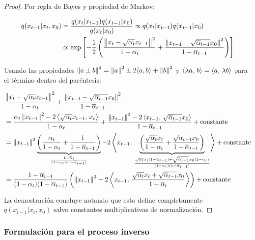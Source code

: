 \begin{proof}
    Por regla de Bayes y propiedad de Markov:

    \begin{align}
        q(x_{t-1}|x_t,x_0) & = \frac{q(x_t|x_{t-1})q(x_{t-1}|x_0)}{q(x_t|x_0)}\propto q(x_t|x_{t-1})q(x_{t-1}|x_0)\\
                           & \propto \exp\left[-\frac{1}{2}\left(\frac{\left\lVert x_t-\sqrt{\alpha_t}x_{t-1} \right\rVert^2}{1-\alpha_t} + \frac{\left\lVert x_{t-1}-\sqrt{\overline{\alpha}_{t-1}}x_0 \right\rVert^2}{1-\overline{\alpha}_{t-1}}\right)\right]
    \end{align}

    Usando las propiedades $\left\lVert a\pm b \right\rVert^2=\left\lVert a \right\rVert^2\pm 2\langle a,b\rangle + \left\lVert b \right\rVert^2$ y $\left\langle \lambda a,\,b\right\rangle = \left\langle a,\,\lambda b\right\rangle$ para el término dentro del paréntesis:

    \begin{align}
         & \frac{\left\lVert x_t-\sqrt{\alpha_t}x_{t-1} \right\rVert^2}{1-\alpha_t} + \frac{\left\lVert x_{t-1}-\sqrt{\overline{\alpha}_{t-1}}x_0 \right\rVert^2}{1-\overline{\alpha}_{t-1}}\\
         & = \frac{\alpha_t\left\lVert x_{t-1} \right\rVert^2-2\left\langle \sqrt{\alpha_t}x_{t-1},\,x_t\right\rangle}{1-\alpha_t} + \frac{\left\lVert x_{t-1} \right\rVert^2-2\left\langle x_{t-1},\,\sqrt{\overline{\alpha}_{t-1}} x_0\right\rangle}{1-\overline{\alpha}_{t-1}}+\operatorname{constante}\\
         & =\left\lVert x_{t-1} \right\rVert^2\underbrace{\left(\frac{\alpha_t}{1-\alpha_t}+\frac{1}{1-\overline{\alpha}_{t-1}}\right)}_{\frac{1-\overline{\alpha}_t}{(1-\alpha_t)(1-\overline{\alpha}_{t-1})}}-2\left\langle x_{t-1},\,\underbrace{\left(\frac{\sqrt{\alpha_t}x_t}{1-\alpha_t} + \frac{\sqrt{\overline{\alpha}_{t-1}}x_0}{1-\overline{\alpha}_{t-1}}\right)}_{\frac{\sqrt{\alpha_t}x_t(1-\overline{\alpha}_{t-1})+\sqrt{\overline{\alpha}_{t-1}}x_0(1-\alpha_t)}{(1-\alpha_t)(1-\overline{\alpha}_{t-1})}}\right\rangle + \operatorname{constante} \\
         & =\frac{1-\overline{\alpha}_{t-1}}{(1-\alpha_t)(1-\overline{\alpha}_{t-1})}\left(\left\lVert x_{t-1} \right\rVert^2-2\left\langle x_{t-1},\,\frac{\sqrt{\alpha_t}x_t + \sqrt{\overline{\alpha}_{t-1}}x_0}{1-\overline{\alpha}_t}\right\rangle\right) + \operatorname{constante}\\
    \end{align}

    La demostración concluye notando que esto define completamente $q(x_{t-1}|x_t,x_0)$ salvo constantes multiplicativas de normalización.
\end{proof}

\subsubsection{Formulación para el proceso inverso}

